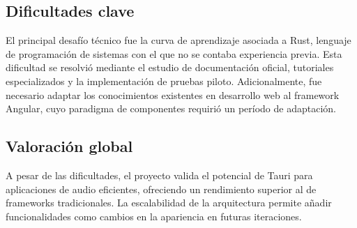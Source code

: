 \documentclass[11pt, a4paper]{article}
\begin{document}
        \subsection{Dificultades clave}

        El principal desafío técnico fue la curva de aprendizaje asociada a Rust, lenguaje de programación de sistemas con el que no se contaba experiencia previa. Esta dificultad se resolvió mediante el estudio de documentación oficial, tutoriales especializados y la implementación de pruebas piloto. Adicionalmente, fue necesario adaptar los conocimientos existentes en desarrollo web al framework Angular, cuyo paradigma de componentes requirió un período de adaptación.

        \subsection{Valoración global}

        A pesar de las dificultades, el proyecto valida el potencial de Tauri para aplicaciones de audio eficientes, ofreciendo un rendimiento superior al de frameworks tradicionales. La escalabilidad de la arquitectura permite añadir funcionalidades como cambios en la apariencia en futuras iteraciones.
\end{document}
